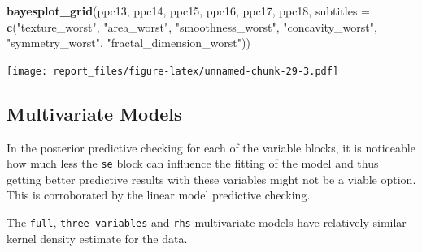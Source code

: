 \documentclass[
]{article}
\newenvironment{Shaded}{\begin{snugshade}}{\end{snugshade}}
\newcommand{\DataTypeTok}[1]{\textcolor[rgb]{0.13,0.29,0.53}{#1}}
\newcommand{\KeywordTok}[1]{\textcolor[rgb]{0.13,0.29,0.53}{\textbf{#1}}}
\newcommand{\NormalTok}[1]{#1}
\newcommand{\StringTok}[1]{\textcolor[rgb]{0.31,0.60,0.02}{#1}}
\begin{document}
\begin{Shaded}
\begin{Highlighting}[]
\KeywordTok{bayesplot_grid}\NormalTok{(ppc13, ppc14, ppc15, ppc16, ppc17, ppc18,}
               \DataTypeTok{subtitles =} \KeywordTok{c}\NormalTok{(}\StringTok{"texture_worst"}\NormalTok{, }\StringTok{"area_worst"}\NormalTok{,}
                             \StringTok{"smoothness_worst"}\NormalTok{, }\StringTok{"concavity_worst"}\NormalTok{, }
                             \StringTok{"symmetry_worst"}\NormalTok{, }\StringTok{"fractal_dimension_worst"}\NormalTok{))}
\end{Highlighting}
\end{Shaded}

\texttt{[image: report\_files/figure-latex/unnamed-chunk-29-3.pdf]}

\hypertarget{multivariate-models}{%
\subsection{Multivariate Models}\label{multivariate-models}}

In the posterior predictive checking for each of the variable blocks, it
is noticeable how much less the \texttt{se} block can influence the
fitting of the model and thus getting better predictive results with
these variables might not be a viable option. This is corroborated by
the linear model predictive checking.

The \texttt{full}, \texttt{three\ variables} and \texttt{rhs}
multivariate models have relatively similar kernel density estimate for
the data.
\end{document}
